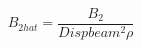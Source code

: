 \begin{equation} \label{eq:B_2_hat_equation}
B_{2 hat} = \frac{B_{2}}{Disp beam^{2} \rho}
\end{equation}
